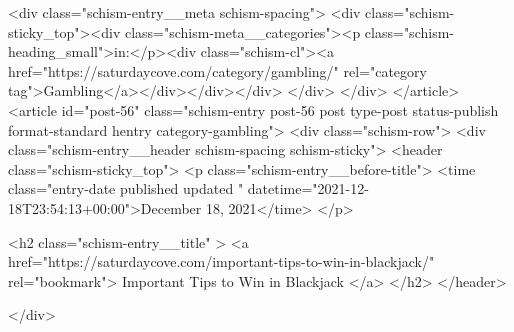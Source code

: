 {		<div class="schism-entry__meta schism-spacing">			<div class="schism-sticky_top"><div class="schism-meta__categories"><p class="schism-heading_small">in:</p><div class="schism-cl"><a href="https://saturdaycove.com/category/gambling/" rel="category tag">Gambling</a></div></div></div>		</div>
	</div>
</article>
<article id="post-56" class="schism-entry post-56 post type-post status-publish format-standard hentry category-gambling">
	<div class="schism-row">		<div class="schism-entry__header schism-spacing schism-sticky">			<header class="schism-sticky_top">				<p class="schism-entry__before-title">
					<time class="entry-date published updated " datetime="2021-12-18T23:54:13+00:00">December 18, 2021</time>				</p>

				<h2 class="schism-entry__title" >
					<a href="https://saturdaycove.com/important-tips-to-win-in-blackjack/" rel="bookmark">
						Important Tips to Win in Blackjack					</a>
				</h2>
			</header>

					</div>

}
